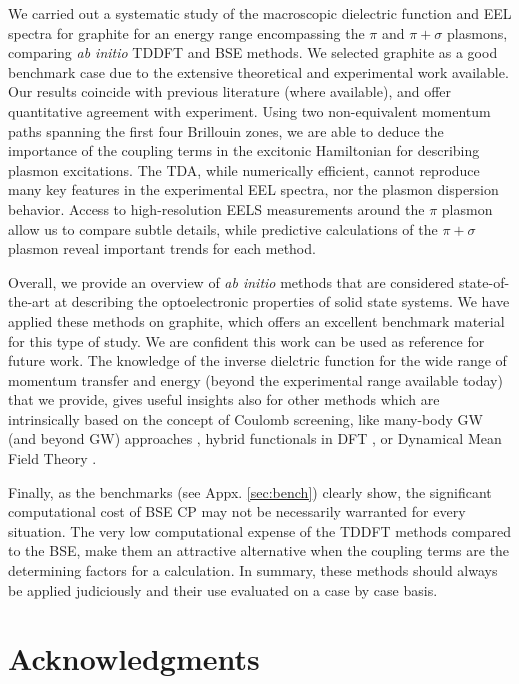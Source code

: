 \documentclass[aps,prb,10pt,showpacs,superscriptaddress,twocolumn,notitlepage]{revtex4-1}
\begin{document}
We carried out a systematic study of the macroscopic dielectric function and EEL
spectra for graphite for an energy range encompassing the $\pi$ and $\pi +
\sigma$ plasmons, comparing \emph{ab initio} TDDFT and BSE methods. We selected
graphite as a good benchmark case due to the extensive theoretical and
experimental work available. Our results coincide with previous literature
(where available), and offer quantitative agreement with experiment. Using two
non-equivalent momentum paths spanning the first four Brillouin zones, we are
able to deduce the importance of the coupling terms in the excitonic Hamiltonian
for describing plasmon excitations. The TDA, while numerically efficient, cannot
reproduce many key features in the experimental EEL spectra, nor the plasmon
dispersion behavior. Access to high-resolution EELS measurements around the
$\pi$ plasmon allow us to compare subtle details, while predictive calculations
of the $\pi + \sigma$ plasmon reveal important trends for each method.

Overall, we provide an overview of \emph{ab initio} methods that are considered
state-of-the-art at describing the optoelectronic properties of solid state
systems. We have applied these methods on graphite, which offers an excellent
benchmark material for this type of study. We are confident this work can be
used as reference for future work. The knowledge of the inverse dielctric
function for the wide range of momentum transfer and energy (beyond the
experimental range available today) that we provide, gives useful insights also
for other methods which are intrinsically based on the concept of Coulomb
screening, like many-body GW (and beyond GW) approaches \cite{rodlPRB17,
luciabook}, hybrid functionals in DFT \cite{krukauJCP06}, or Dynamical Mean
Field Theory \cite{biermannJPCM14}.

Finally, as the benchmarks (see Appx. \ref{sec:bench}) clearly show, the
significant computational cost of BSE CP may not be necessarily warranted for
every situation. The very low computational expense of the TDDFT methods
compared to the BSE, make them an attractive alternative when the coupling terms
are the determining factors for a calculation. In summary, these methods should
always be applied judiciously and their use evaluated on a case by case basis.


\section{Acknowledgments}
\end{document}
